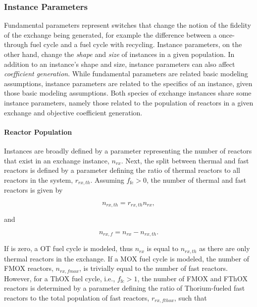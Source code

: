 \subsubsection{Instance Parameters}

Fundamental parameters represent switches that change the notion of the fidelity
of the exchange being generated, for example the difference between a
once-through fuel cycle and a fuel cycle with recycling. Instance parameters, on
the other hand, change the \textit{shape} and \textit{size} of instances in a
given population. In addition to an instance's shape and size, instance
parameters can also affect \textit{coefficient generation}. While fundamental
parameters are related basic modeling assumptions, instance parameters are
related to the specifics of an instance, given those basic modeling
assumptions. Both species of exchange instances share some instance parameters,
namely those related to the population of reactors in a given exchange and
objective coefficient generation.

\paragraph{Reactor Population}

Instances are broadly defined by a parameter representing the number of reactors
that exist in an exchange instance, $n_{rx}$. Next, the split between thermal
and fast reactors is defined by a parameter defining the ratio of thermal
reactors to all reactors in the system, $r_{rx, th}$. Assuming $f_{\text{fc}} >
0$, the number of thermal and fast reactors is given by

\begin{equation}
n_{rx, th} = r_{rx, th} n_{rx},
\end{equation}

\noindent
and 

\begin{equation}
n_{rx, f} = n_{rx} - n_{rx, th}.
\end{equation}

\noindent
If \ffc is zero, a OT fuel cycle is modeled, thus $n_{rx}$ is equal to $n_{rx,
  th}$ as there are only thermal reactors in the exchange. If a MOX fuel cycle
is modeled, the number of FMOX reactors, $n_{rx, fmox}$, is trivially equal to
the number of fast reactors. However, for a ThOX fuel cycle, i.e.,
$f_{\text{fc}} > 1$, the number of FMOX and FThOX reactors is determined by a
parameter defining the ratio of Thorium-fueled fast reactors to the total
population of fast reactors, $r_{rx, fthox}$, such that

